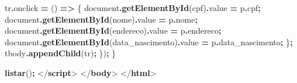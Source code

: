 \documentclass[
]{book}
\newenvironment{Shaded}{\begin{snugshade}}{\end{snugshade}}
\newcommand{\AttributeTok}[1]{\textcolor[rgb]{0.13,0.29,0.53}{#1}}
\newcommand{\BuiltInTok}[1]{#1}
\newcommand{\DataTypeTok}[1]{\textcolor[rgb]{0.13,0.29,0.53}{#1}}
\newcommand{\FunctionTok}[1]{\textcolor[rgb]{0.13,0.29,0.53}{\textbf{#1}}}
\newcommand{\KeywordTok}[1]{\textcolor[rgb]{0.13,0.29,0.53}{\textbf{#1}}}
\newcommand{\NormalTok}[1]{#1}
\newcommand{\OperatorTok}[1]{\textcolor[rgb]{0.81,0.36,0.00}{\textbf{#1}}}
\newcommand{\StringTok}[1]{\textcolor[rgb]{0.31,0.60,0.02}{#1}}
\begin{document}
\begin{Shaded}
\begin{Highlighting}[]
\NormalTok{    tr}\OperatorTok{.}\AttributeTok{onclick} \OperatorTok{=}\NormalTok{ () }\KeywordTok{=\textgreater{}}\NormalTok{ \{}
      \BuiltInTok{document}\OperatorTok{.}\FunctionTok{getElementById}\NormalTok{(}\StringTok{\textquotesingle{}cpf\textquotesingle{}}\NormalTok{)}\OperatorTok{.}\AttributeTok{value} \OperatorTok{=}\NormalTok{ p}\OperatorTok{.}\AttributeTok{cpf}\OperatorTok{;}
      \BuiltInTok{document}\OperatorTok{.}\FunctionTok{getElementById}\NormalTok{(}\StringTok{\textquotesingle{}nome\textquotesingle{}}\NormalTok{)}\OperatorTok{.}\AttributeTok{value} \OperatorTok{=}\NormalTok{ p}\OperatorTok{.}\AttributeTok{nome}\OperatorTok{;}
      \BuiltInTok{document}\OperatorTok{.}\FunctionTok{getElementById}\NormalTok{(}\StringTok{\textquotesingle{}endereco\textquotesingle{}}\NormalTok{)}\OperatorTok{.}\AttributeTok{value} \OperatorTok{=}\NormalTok{ p}\OperatorTok{.}\AttributeTok{endereco}\OperatorTok{;}
      \BuiltInTok{document}\OperatorTok{.}\FunctionTok{getElementById}\NormalTok{(}\StringTok{\textquotesingle{}data\_nascimento\textquotesingle{}}\NormalTok{)}\OperatorTok{.}\AttributeTok{value} \OperatorTok{=}\NormalTok{ p}\OperatorTok{.}\AttributeTok{data\_nascimento}\OperatorTok{;}
\NormalTok{    \}}\OperatorTok{;}
\NormalTok{    tbody}\OperatorTok{.}\FunctionTok{appendChild}\NormalTok{(tr)}\OperatorTok{;}
\NormalTok{  \})}\OperatorTok{;}
\NormalTok{\}}

\FunctionTok{listar}\NormalTok{()}\OperatorTok{;}
\DataTypeTok{\textless{}/}\KeywordTok{script}\DataTypeTok{\textgreater{}}
\DataTypeTok{\textless{}/}\KeywordTok{body}\DataTypeTok{\textgreater{}}
\DataTypeTok{\textless{}/}\KeywordTok{html}\DataTypeTok{\textgreater{}}
\end{Highlighting}
\end{Shaded}
\end{document}
